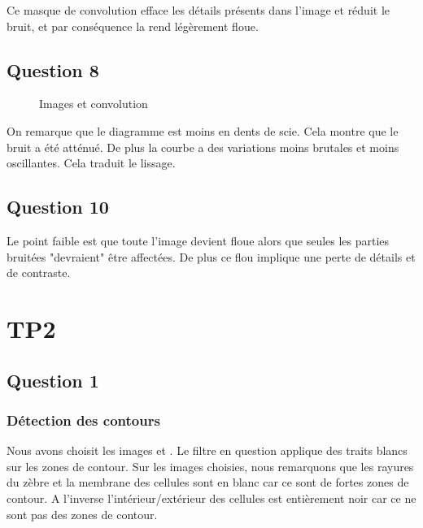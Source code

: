 \documentclass{report}
\begin{document}
			 Ce masque de convolution efface les détails présents dans l'image et réduit le bruit, et par conséquence la rend légèrement floue.
			 
		\section{Question 8}
			\begin{figure}[H]
				\begin{framed}
					\begin{minipage}{0.33\textwidth}
					\end{minipage}
					\begin{minipage}{0.33\textwidth}
					\end{minipage}
					\begin{minipage}{0.33\textwidth}
					\end{minipage}
					\caption{Images et convolution}
				\end{framed}
			\end{figure}
			
			On remarque que le diagramme est moins en dents de scie. Cela montre que le bruit a été atténué. De plus la courbe a des variations moins brutales et moins oscillantes. Cela traduit le lissage.
			
		\section{Question 10}
			Le point faible est que toute l'image devient floue alors que seules les parties bruitées "devraient" être affectées. De plus ce flou implique une perte de détails et de contraste.
			
	\chapter{TP2}
		\section{Question 1}
			\subsection{Détection des contours}
				Nous avons choisit les images  et . Le filtre en question applique des traits blancs sur les zones de contour. Sur les images choisies, nous remarquons que les rayures du zèbre et la membrane des cellules sont en blanc car ce sont de fortes zones de contour. A l'inverse l'intérieur/extérieur des cellules est entièrement noir car ce ne sont pas des zones de contour.
				
\end{document}
